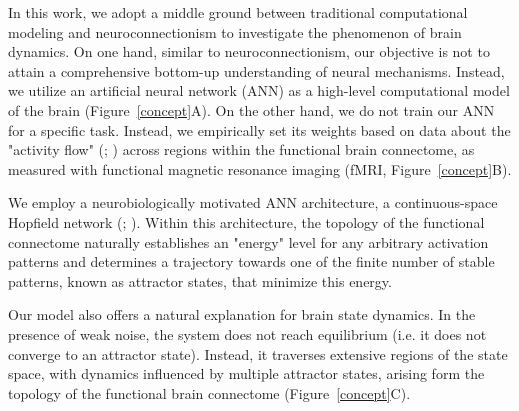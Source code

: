 \documentclass{article}
\begin{document}
In this work, we adopt a middle ground between traditional computational modeling and neuroconnectionism to investigate the phenomenon of brain dynamics.
On one hand, similar to neuroconnectionism, our objective is not to attain a comprehensive bottom-up understanding of neural mechanisms. Instead, we utilize an artificial neural network (ANN) as a high-level computational model of the brain (Figure~\ref{concept}A).
On the other hand, we do not train our ANN for a specific task. Instead, we empirically set its weights based on  data about the "activity flow" (\href{https://doi.org/10.1038/nn.4406}{}; \href{https://doi.org/10.1038/s41467-017-01000-w}{}) across regions within the functional brain connectome, as measured with functional magnetic resonance imaging (fMRI, Figure~\ref{concept}B).

We employ a neurobiologically motivated ANN architecture, a continuous-space Hopfield network (\href{https://doi.org/10.1073/pnas.79.8.2554}{}; \href{https://doi.org/10.1038/s42254-023-00595-y}{}).
Within this architecture, the topology of the functional connectome naturally establishes an "energy" level for any arbitrary activation patterns and determines a trajectory towards one of the finite number of stable patterns, known as attractor states, that minimize this energy.

Our model also offers a natural explanation for brain state dynamics.
In the presence of weak noise, the system does not reach equilibrium (i.e. it does not converge to an attractor state). Instead, it traverses extensive regions of the state space, with dynamics influenced by multiple attractor states, arising form the topology of the functional brain connectome (Figure~\ref{concept}C).
\end{document}
